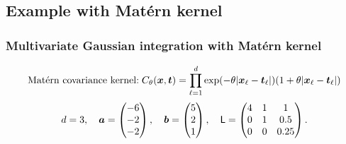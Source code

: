 \documentclass[handout, 10pt,compress,xcolor={usenames,dvipsnames}]{beamer} %
\renewcommand{\mSigma}{\Sigma}
\newcommand{\dvt}{\dif {\vt}}
\begin{document}
\subsection{Example with Mat\'ern  kernel}
\begin{frame}
\frametitle{Multivariate Gaussian integration with Mat\'ern kernel}
\vspace{-8ex}
\begin{align}
\label{eqn:matern_kernel_order_3by2}
\text{Mat\'ern covariance kernel:} \; C_{\theta}(\vx, \vt) = \prod_{\ell=1}^d \exp(-\theta|\vx_\ell-\vt_\ell|)(1+\theta |\vx_\ell-\vt_\ell|) %
\end{align}
\begin{equation*}
d = 3, \quad \boldsymbol{a} = \begin{pmatrix}
-6 \\ -2 \\ -2
\end{pmatrix}, \quad 
\boldsymbol{b} = \begin{pmatrix}
5 \\ 2 \\ 1
\end{pmatrix} , \quad 
\mathsf{L} = \begin{pmatrix}
4 & 1 & 1 \\ 0 & 1 & 0.5 \\ 0 & 0 & 0.25
\end{pmatrix}.
\end{equation*}

\vspace{-3ex}


\end{frame}
\end{document}
